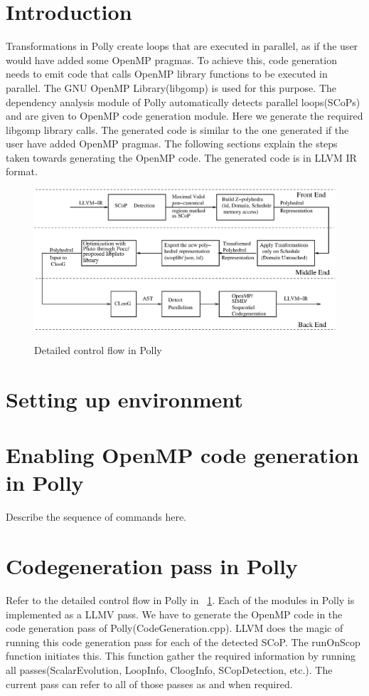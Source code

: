 \label{chap:openmp}

\section{Introduction}
Transformations in Polly create loops that are executed in parallel, as if the user would have
added some OpenMP pragmas. To achieve this, code generation needs to emit code that calls OpenMP
library functions to be executed in parallel. The GNU OpenMP Library(libgomp) is used for this purpose. The
dependency analysis module of Polly automatically detects parallel loops(SCoPs) and are given to OpenMP
code generation module. Here we generate the required libgomp library calls. The generated code is similar
to the one generated if the user have added OpenMP pragmas\cite{parfor}. The following sections explain the steps
taken towards generating the OpenMP code. The generated code is in LLVM IR format.
\begin{figure}
\begin{center}
  \label{detailed}
  \includegraphics[width=1.1\textwidth]{images/detailedarch.eps}
  \caption{Detailed control flow in Polly}
\end{center}
\end{figure}


\section{Setting up environment}
\section{Enabling OpenMP code generation in Polly}
Describe the sequence of commands here.
\section{Codegeneration pass in Polly}
Refer to the detailed control flow in Polly in ~\ref{detailed}. Each of the modules in Polly is
implemented as a LLMV pass\cite{llvmpass}. We have to generate the OpenMP code in the code 
generation pass of Polly(CodeGeneration.cpp). LLVM does the magic of running this code generation
pass for each of the detected SCoP. The runOnScop function initiates this. This function gather
the required information by running all passes(ScalarEvolution, LoopInfo, CloogInfo, SCopDetection, etc.).
The current pass can refer to all of those passes as and when required. 


